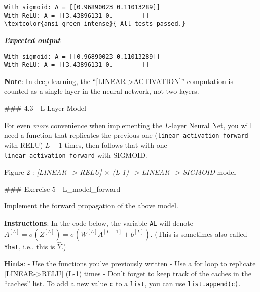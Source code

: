 \documentclass[11pt]{article}
\begin{document}
    \begin{Verbatim}[commandchars=\\\{\}]
With sigmoid: A = [[0.96890023 0.11013289]]
With ReLU: A = [[3.43896131 0.        ]]
\textcolor{ansi-green-intense}{ All tests passed.}
    \end{Verbatim}

    \textbf{\emph{Expected output}}

\begin{verbatim}
With sigmoid: A = [[0.96890023 0.11013289]]
With ReLU: A = [[3.43896131 0.        ]]
\end{verbatim}

    \textbf{Note}: In deep learning, the
``{[}LINEAR-\textgreater ACTIVATION{]}'' computation is counted as a
single layer in the neural network, not two layers.

    \#\#\# 4.3 - L-Layer Model

For even \emph{more} convenience when implementing the \(L\)-layer
Neural Net, you will need a function that replicates the previous one
(\texttt{linear\_activation\_forward} with RELU) \(L-1\) times, then
follows that with one \texttt{linear\_activation\_forward} with SIGMOID.

Figure 2 : \emph{{[}LINEAR -\textgreater{} RELU{]} \(\times\) (L-1)
-\textgreater{} LINEAR -\textgreater{} SIGMOID} model

\#\#\# Exercise 5 - L\_model\_forward

Implement the forward propagation of the above model.

\textbf{Instructions}: In the code below, the variable \texttt{AL} will
denote
\(A^{[L]} = \sigma(Z^{[L]}) = \sigma(W^{[L]} A^{[L-1]} + b^{[L]})\).
(This is sometimes also called \texttt{Yhat}, i.e., this is
\(\hat{Y}\).)

\textbf{Hints}: - Use the functions you've previously written - Use a
for loop to replicate {[}LINEAR-\textgreater RELU{]} (L-1) times - Don't
forget to keep track of the caches in the ``caches'' list. To add a new
value \texttt{c} to a \texttt{list}, you can use
\texttt{list.append(c)}.
\end{document}
